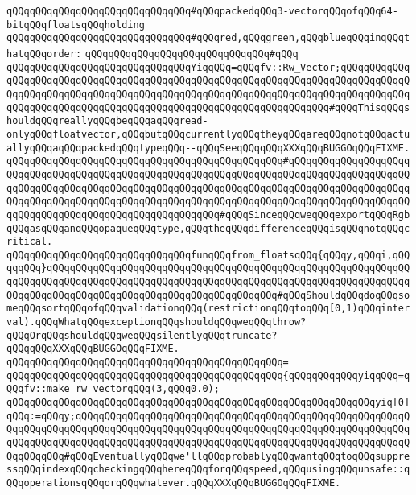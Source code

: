 \verb|qQQqqQQqqQQqqQQqqQQqqQQqqQQqqQQq#qQQqpackedqQQq3-vectorqQQqofqQQq64-bitqQQqfloatsqQQqholding|\newline
\verb|qQQqqQQqqQQqqQQqqQQqqQQqqQQqqQQq#qQQqred,qQQqgreen,qQQqblueqQQqinqQQqthatqQQqorder:|\newline
\verb|qQQqqQQqqQQqqQQqqQQqqQQqqQQqqQQq#qQQq|\newline
\verb|qQQqqQQqqQQqqQQqqQQqqQQqqQQqqQQqYiqqQQq=qQQqfv::Rw_Vector;qQQqqQQqqQQqqQQqqQQqqQQqqQQqqQQqqQQqqQQqqQQqqQQqqQQqqQQqqQQqqQQqqQQqqQQqqQQqqQQqqQQqqQQqqQQqqQQqqQQqqQQqqQQqqQQqqQQqqQQqqQQqqQQqqQQqqQQqqQQqqQQqqQQqqQQqqQQqqQQqqQQqqQQqqQQqqQQqqQQqqQQqqQQqqQQqqQQqqQQqqQQqqQQq#qQQqThisqQQqshouldqQQqreallyqQQqbeqQQqaqQQqread-onlyqQQqfloatvector,qQQqbutqQQqcurrentlyqQQqtheyqQQqareqQQqnotqQQqactuallyqQQqaqQQqpackedqQQqtypeqQQq--qQQqSeeqQQq|\verb|qQQqXXXqQQqBUGGOqQQqFIXME.|\newline
\verb|qQQqqQQqqQQqqQQqqQQqqQQqqQQqqQQqqQQqqQQqqQQqqQQq#qQQqqQQqqQQqqQQqqQQqqQQqqQQqqQQqqQQqqQQqqQQqqQQqqQQqqQQqqQQqqQQqqQQqqQQqqQQqqQQqqQQqqQQqqQQqqQQqqQQqqQQqqQQqqQQqqQQqqQQqqQQqqQQqqQQqqQQqqQQqqQQqqQQqqQQqqQQqqQQqqQQqqQQqqQQqqQQqqQQqqQQqqQQqqQQqqQQqqQQqqQQqqQQqqQQqqQQqqQQqqQQqqQQqqQQqqQQqqQQqqQQqqQQqqQQqqQQqqQQqqQQqqQQq#qQQqSinceqQQqweqQQqexportqQQqRgbqQQqasqQQqanqQQqopaqueqQQqtype,qQQqtheqQQqdifferenceqQQqisqQQqnotqQQqcritical.|\newline
\newline
\verb|qQQqqQQqqQQqqQQqqQQqqQQqqQQqqQQqfunqQQqfrom_floatsqQQq{qQQqy,qQQqi,qQQqqqQQq}qQQqqQQqqQQqqQQqqQQqqQQqqQQqqQQqqQQqqQQqqQQqqQQqqQQqqQQqqQQqqQQqqQQqqQQqqQQqqQQqqQQqqQQqqQQqqQQqqQQqqQQqqQQqqQQqqQQqqQQqqQQqqQQqqQQqqQQqqQQqqQQqqQQqqQQqqQQqqQQqqQQqqQQqqQQqqQQqqQQq#qQQqShouldqQQqdoqQQqsomeqQQqsortqQQqofqQQqvalidationqQQq(restrictionqQQqtoqQQq[0,1)qQQqinterval).qQQqWhatqQQqexceptionqQQqshouldqQQqweqQQqthrow?qQQqOrqQQqshouldqQQqweqQQqsilentlyqQQqtruncate?qQQqqQQqXXXqQQqBUGGOqQQqFIXME.|\newline
\verb|qQQqqQQqqQQqqQQqqQQqqQQqqQQqqQQqqQQqqQQqqQQqqQQq=|\newline
\verb|qQQqqQQqqQQqqQQqqQQqqQQqqQQqqQQqqQQqqQQqqQQqqQQq{qQQqqQQqqQQqyiqqQQq=qQQqfv::make_rw_vectorqQQq(3,qQQq0.0);|\newline
\newline
\verb|qQQqqQQqqQQqqQQqqQQqqQQqqQQqqQQqqQQqqQQqqQQqqQQqqQQqqQQqqQQqqQQqyiq[0]qQQq:=qQQqy;qQQqqQQqqQQqqQQqqQQqqQQqqQQqqQQqqQQqqQQqqQQqqQQqqQQqqQQqqQQqqQQqqQQqqQQqqQQqqQQqqQQqqQQqqQQqqQQqqQQqqQQqqQQqqQQqqQQqqQQqqQQqqQQqqQQqqQQqqQQqqQQqqQQqqQQqqQQqqQQqqQQqqQQqqQQqqQQqqQQqqQQqqQQqqQQqqQQqqQQqqQQqqQQq#qQQqEventuallyqQQqwe'llqQQqprobablyqQQqwantqQQqtoqQQqsuppressqQQqindexqQQqcheckingqQQqhereqQQqforqQQqspeed,qQQqusingqQQqunsafe::qQQqoperationsqQQqorqQQqwhatever.qQQqXXXqQQqBUGGOqQQqFIXME.|\newline
